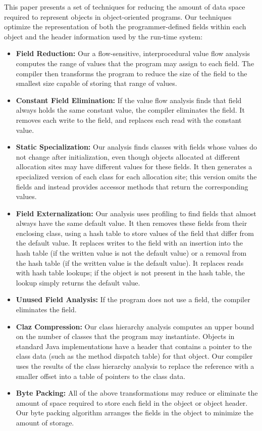 \documentclass[preprint]{acmconf}
\begin{document}
This paper presents a set of techniques for reducing the
amount of data space required to represent objects
in object-oriented programs. Our techniques optimize
the representation of both the programmer-defined fields
within each object and the header information used by the
run-time system:
\begin{itemize}
\item {\bf Field Reduction:} 
Our a flow-sensitive, interprocedural value flow
analysis computes the range of values that the program
may assign to each field. The compiler then transforms the program
to reduce the size of the field to the smallest size 
capable of storing that range of values. 
\item {\bf Constant Field Elimination:} 
If the value flow analysis finds that field always holds
the same constant value, the compiler eliminates the field. 
It removes each write to the field, and replaces each read
with the constant value.
\item {\bf Static Specialization:} Our analysis finds 
classes with fields whose values do not change after initialization,
even though objects allocated at different allocation sites may
have different values for these fields. It then generates 
a specialized version of each class for each allocation site;
this version omits the fields and instead provides accessor
methods that return the corresponding values. 
\item {\bf Field Externalization:} Our analysis uses profiling
to find fields that almost always have the same default value. 
It then removes these fields from their enclosing class, 
using a hash table to store values of the field that differ
from the default value. It replaces writes to the field with
an insertion into the hash table (if the written value is not the
default value) or a removal from the hash table (if the written value
is the default value). It replaces reads with hash table lookups; 
if the object is not present in the hash table, the lookup simply
returns the default value. 
\item {\bf Unused Field Analysis:} If the program does not
use a field, the compiler eliminates the field. 
\item {\bf Claz Compression:} Our class hierarchy analysis
computes an upper bound on the number of classes that the
program may instantiate. Objects in standard 
Java implementations have a header that contains a pointer
to the class data (such as the method dispatch table) for that object. 
Our compiler uses the results of the class
hierarchy analysis to replace the reference with a smaller
offset into a table of pointers to the class data. 
\item {\bf Byte Packing:} All of the above transformations may
reduce or eliminate the amount of space required to store each
field in the object or object header. Our byte packing algorithm
arranges the fields in the object to minimize the amount of 
storage. 
\end{itemize}
\end{document}
